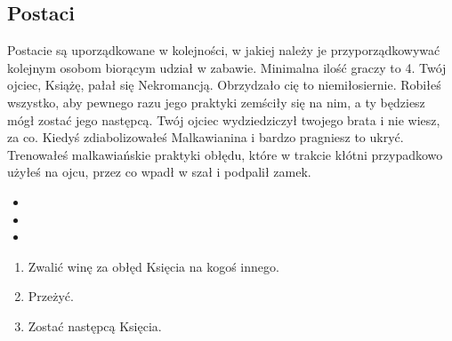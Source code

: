 	\subsection{Postaci}
	\label{sec:characters}
		Postacie są uporządkowane w kolejności, w jakiej należy je przyporządkowywać kolejnym osobom biorącym udział w zabawie.
		Minimalna ilość graczy to 4.
		\thispagestyle{empty}
			{}{
			Twój ojciec, Książę, pałał się Nekromancją.
			Obrzydzało cię to niemiłosiernie.
			Robiłeś wszystko, aby pewnego razu jego praktyki zemściły się na nim, a ty będziesz mógł zostać jego następcą.
			Twój ojciec wydziedziczył twojego brata i nie wiesz, za co.
			Kiedyś zdiabolizowałeś Malkawianina i bardzo pragniesz to ukryć.
			Trenowałeś malkawiańskie praktyki obłędu, które w trakcie kłótni przypadkowo użyłeś na ojcu, przez co wpadł w szał i podpalił zamek.}
			{
				\begin{itemize}[noitemsep]
					\item {}
					\item {}
					\item {}
				\end{itemize}

			}{
				\begin{enumerate}[noitemsep]
					\item Zwalić winę za obłęd Księcia na kogoś innego.
					\item Przeżyć.
					\item Zostać następcą Księcia.
				\end{enumerate}
			}
			{}
			{}
			
